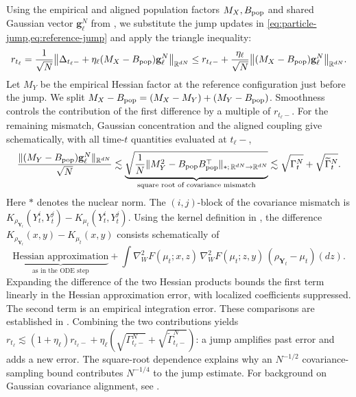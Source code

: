 Using the empirical and aligned population factors \(M_X,B_{\rm pop}\)
and shared Gaussian vector \(\mathbf g_\ell^N\) from
, we substitute the jump updates in
\cref{eq:particle-jump,eq:reference-jump} and apply the triangle inequality:
\[
 r_{t_\ell}
 =\frac1{\sqrt N}\bigl\|\Delta_{t_\ell-}
 +\eta_\ell(M_X-B_{\rm pop})\mathbf g_\ell^N\bigr\|_{\mathbb R^{dN}}
 \le r_{t_\ell-}
 +\frac{\eta_\ell}{\sqrt N}
 \bigl\|(M_X-B_{\rm pop})\mathbf g_\ell^N\bigr\|_{\mathbb R^{dN}}.
\]
Let \(M_Y\) be the empirical Hessian factor at the reference configuration
just before the jump. We split
\(M_X-B_{\rm pop}=(M_X-M_Y)+(M_Y-B_{\rm pop})\).
Smoothness controls the contribution of the first difference by a multiple
of \(r_{t_\ell-}\). For the remaining mismatch, Gaussian concentration and
the aligned coupling give schematically, with all time-\(t\) quantities
evaluated at \(t_\ell-\),
\[
 \frac{\|(M_Y-B_{\rm pop})\mathbf g_\ell^N\|_{\mathbb R^{dN}}}{\sqrt N}
 \lesssim
 \underbrace{
 \sqrt{\frac1N
 \|M_Y^2-B_{\rm pop}B_{\rm pop}^{\top}\|_{*;\,\mathbb R^{dN}\to\mathbb R^{dN}}}
 }_{\text{square root of covariance mismatch}}
 \lesssim \sqrt{\Gamma_t^N}+\sqrt{\widetilde\Gamma_t^N}.
\]
Here \(*\) denotes the nuclear norm. The \((i,j)\)-block of the covariance
mismatch is \(K_{\rho_{\mathbf Y_t}}(Y_t^i,Y_t^j)-K_{\mu_t}(Y_t^i,Y_t^j)\).
Using the kernel definition in , the difference
\(K_{\rho_{\mathbf Y_t}}(x,y)-K_{\mu_t}(x,y)\) consists schematically of
\[
 \underbrace{\text{Hessian approximation}}_{\text{as in the ODE step}}
 +\int\nabla_W^2F(\mu_t;x,z)\,
 \nabla_W^2F(\mu_t;z,y)\,
 (\rho_{\mathbf Y_t}-\mu_t)(dz).
\]
Expanding the difference of the two Hessian products bounds the first term
linearly in the Hessian approximation error, with localized coefficients suppressed.
The second term is an empirical integration error.
These comparisons are established in
.
Combining the two contributions yields
\(r_{t_\ell}\lesssim(1+\eta_\ell)r_{t_\ell-}
+\eta_\ell(\sqrt{\Gamma_{t_\ell-}^N}+\sqrt{\widetilde\Gamma_{t_\ell-}^N})\):
a jump amplifies past error and adds a new error.
The square-root dependence explains why an \(N^{-1/2}\) covariance-sampling
bound contributes \(N^{-1/4}\) to the jump estimate.
For background on Gaussian covariance alignment, see \citet{masarotto2019procrustes}.

